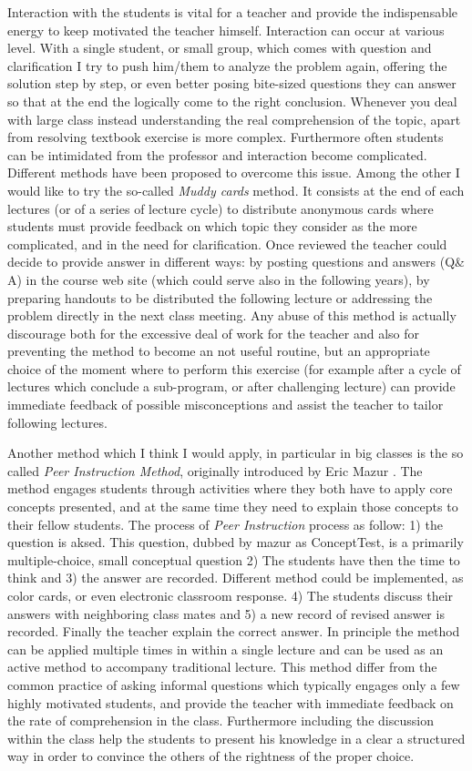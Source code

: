 \documentclass[12pt,a4paper]{article}
\begin{document}
Interaction with the students is vital for a teacher and provide the
indispensable energy to keep motivated the teacher
himself. Interaction can occur at various level. 
With a
single student, or small group,  which comes with question and
clarification I try to push him/them to analyze the problem again, offering
the solution step by step, or even better posing bite-sized questions
they can answer so that at the end the logically come to the right
conclusion. Whenever you deal with large class instead understanding
the real comprehension of the topic, apart from resolving textbook
exercise is more complex. Furthermore often students can be
intimidated from the professor and interaction become
complicated. Different methods have been proposed to overcome this
issue. Among the other I would like to try the so-called \emph{Muddy
  cards} method. It consists at the end of each lectures (or of a
series of lecture cycle) to distribute anonymous cards where students
must provide feedback on which topic they consider as the more
complicated, and in the need for clarification. Once reviewed the
teacher could decide to provide answer in different ways: by posting
questions and answers (Q\& A) in the course web site (which could
serve also in the following years), by preparing handouts to be
distributed the following lecture or addressing the problem directly
in the next class meeting. Any abuse of this method is actually
discourage both for the excessive deal of work for the teacher and
also for preventing the method to become an not useful routine, but an
appropriate choice of the moment where to perform this exercise (for
example after a cycle of lectures which conclude a sub-program, or
after challenging lecture) can provide immediate feedback of possible
misconceptions and assist the teacher to tailor following lectures. 

Another method which I think I would apply, in particular in big
classes is the so called \emph{Peer Instruction Method},  originally
introduced by Eric Mazur \cite{mazur2013peer}. The method engages
students through activities where they both have to apply core concepts
presented, and at the same time they need to explain those concepts to
their fellow students. The process of \emph{Peer Instruction} process
as follow: 1) the question is aksed. This question, dubbed by mazur as
ConceptTest, is a primarily multiple-choice, small conceptual question
2) The students have then the time to think and 3) the answer are
recorded. Different method could be implemented, as color cards, or
even electronic classroom response. 4) The students discuss their
answers with neighboring class mates and 5) a new record of revised
answer is recorded. Finally the teacher explain the correct answer. In
principle the method can be applied multiple times in within a single
lecture and can be used as an active method to accompany traditional
lecture. This method differ from the common practice of asking
informal questions which typically engages only  a few highly
motivated students, and provide the teacher with immediate feedback on
the rate of comprehension in the class. Furthermore including the
discussion within the class help the students to present his knowledge
in a clear a structured way in order to convince the others of the
rightness of the proper choice. 
\end{document}
